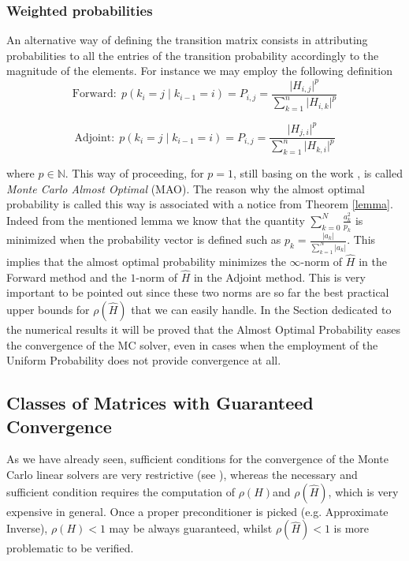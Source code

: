 \subsubsection{Weighted probabilities}
An alternative way of defining the transition matrix consists in attributing
probabilities to all the entries of the transition probability accordingly
to the magnitude of the elements. For instance we may employ the following
definition
\[
\text{Forward}: \;
p(k_i=j \;\lvert\;k_{i-1}=i )=P_{i,j}=\frac{\lvert
H_{i,j}\rvert^p}{\sum_{k=1}^n
\lvert H_{i,k}\rvert^p}
\]

\[
\text{Adjoint}: \;
p(k_i=j \;\lvert\;k_{i-1}=i )=P_{i,j}=\frac{\lvert
H_{j,i}\rvert^p}{\sum_{k=1}^n
\lvert H_{k,i}\rvert^p}
\]


where $p\in \mathbb{N}$.
This way of proceeding, for $p=1$, still basing on the work \cite{AADBTW2005},
is called
\textit{Monte Carlo Almost Optimal} (MAO).
The reason why the almost optimal probability is called this way is associated
with a notice from Theorem \ref{lemma}. Indeed from
the mentioned lemma we know that the quantity $\displaystyle
\sum_{k=0}^N\frac{a_k^2}{p_k}$ is minimized when the probability vector is
defined such as $\displaystyle p_k=\frac{\lvert a_k\rvert}{\sum_{k=1}^N \lvert
a_k\rvert}$. This implies that the almost optimal probability minimizes the
$\infty$-norm of $\hat{H}$ in the Forward method and the $1$-norm of $\hat{H}$
in the
Adjoint method. This is very important to be pointed out since these two norms
are so far the best practical upper bounds for $\rho(\hat{H})$ that we can
easily
handle. In the Section dedicated to the numerical results it will be proved
that the Almost Optimal Probability eases the convergence of the MC solver,
even in cases when the employment of the Uniform Probability does not provide
convergence at all.

\subsection{Classes of Matrices with Guaranteed Convergence}

As we have already seen, sufficient conditions for
the convergence of the Monte Carlo linear solvers are very restrictive (see
\cite{MASC2013}), whereas the necessary and sufficient condition requires the
computation of
$\rho(H)$and $\rho(\hat{H})$, which is very expensive in general. Once a
proper
preconditioner is picked (e.g. Approximate Inverse), $\rho(H)<1$ may
be always guaranteed, whilst $\rho(\hat{H})<1$ is more
problematic to be verified.

